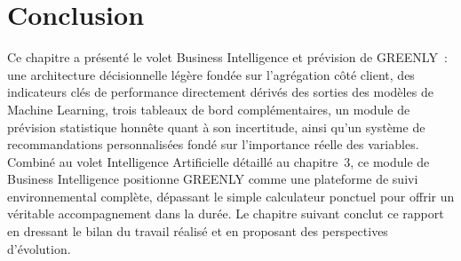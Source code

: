 \section*{Conclusion}
Ce chapitre a présenté le volet Business Intelligence et prévision de GREENLY~: une architecture décisionnelle légère fondée sur l'agrégation côté client, des indicateurs clés de performance directement dérivés des sorties des modèles de Machine Learning, trois tableaux de bord complémentaires, un module de prévision statistique honnête quant à son incertitude, ainsi qu'un système de recommandations personnalisées fondé sur l'importance réelle des variables. Combiné au volet Intelligence Artificielle détaillé au chapitre~3, ce module de Business Intelligence positionne GREENLY comme une plateforme de suivi environnemental complète, dépassant le simple calculateur ponctuel pour offrir un véritable accompagnement dans la durée. Le chapitre suivant conclut ce rapport en dressant le bilan du travail réalisé et en proposant des perspectives d'évolution.
